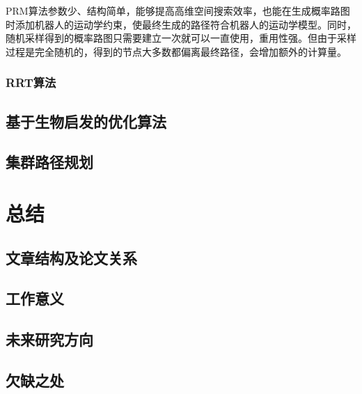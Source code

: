 \documentclass[conference]{IEEEtran}
\begin{document}
PRM算法参数少、结构简单，能够提高高维空间搜索效率，也能在生成概率路图时添加机器人的运动学约束，使最终生成的路径符合机器人的运动学模型。同时，随机采样得到的概率路图只需要建立一次就可以一直使用，重用性强。但由于采样过程是完全随机的，得到的节点大多数都偏离最终路径，会增加额外的计算量。

\subsubsection{RRT算法}%



\subsection{基于生物启发的优化算法}%



\subsection{集群路径规划}%




\section{总结}%



\subsection{文章结构及论文关系}%



\subsection{工作意义}%



\subsection{未来研究方向}%



\subsection{欠缺之处}%




\end{document}
